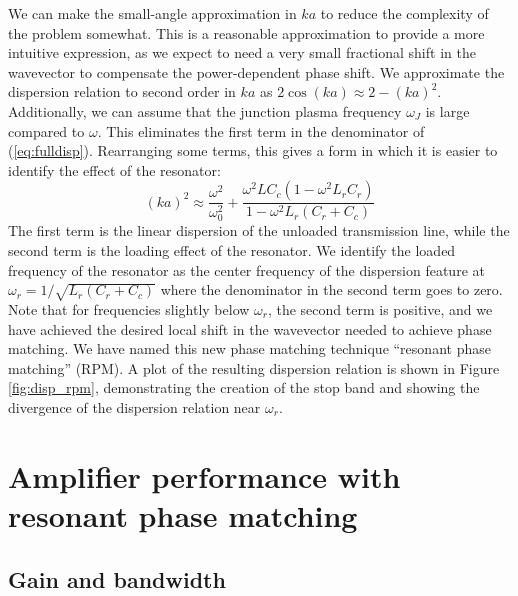 We can make the small-angle approximation in $ka$ to reduce the complexity of the problem somewhat.  This is a reasonable approximation to provide a more intuitive expression, as we expect to need a very small fractional shift in the wavevector to compensate the power-dependent phase shift.  We approximate the dispersion relation to second order in $ka$ as $2 \cos(ka) \approx 2 - (ka)^2$.  Additionally, we can assume that the junction plasma frequency $\omega_J$ is large compared to $\omega$.  This eliminates the first term in the denominator of (\ref{eq:fulldisp}).  Rearranging some terms, this gives a form in which it is easier to identify the effect of the resonator:
\begin{equation}
(ka)^2 \approx \frac{\omega^2}{\omega_0^2} + \frac{\omega^2 L C_c (1 - \omega^2 L_r C_r)}{1 - \omega^2 L_r (C_r + C_c)}
\label{eq:approxdisp}
\end{equation}
The first term is the linear dispersion of the unloaded transmission line, while the second term is the loading effect of the resonator.  We identify the loaded frequency of the resonator as the center frequency of the dispersion feature at $\omega_r = 1 / \sqrt{L_r (C_r + C_c)}$ where the denominator in the second term goes to zero.  Note that for frequencies slightly below $\omega_r$, the second term is positive, and we have achieved the desired local shift in the wavevector needed to achieve phase matching.  We have named this new phase matching technique ``resonant phase matching'' (RPM).  A plot of the resulting dispersion relation is shown in Figure \ref{fig:disp_rpm}, demonstrating the creation of the stop band and showing the divergence of the dispersion relation near $\omega_r$.



\section{Amplifier performance with resonant phase matching}\label{s:rpm_perf}

\subsection{Gain and bandwidth}

